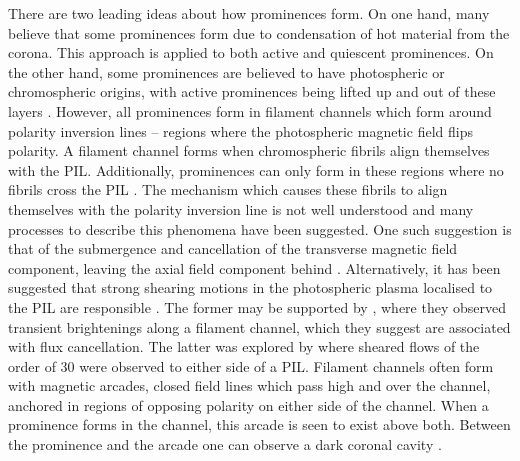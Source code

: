There are two leading ideas about how prominences form. On one hand, many believe that some prominences form due to condensation of hot material from the corona. This approach is applied to both active and quiescent prominences. On the other hand, some prominences are believed to have photospheric or chromospheric origins, with active prominences being lifted up and out of these layers \citep{tandberg-hanssen_nature_1995}. However, all prominences form in filament channels which form around polarity inversion lines \citep[PILs; ][]{vial_solar_2015} -- regions where the photospheric magnetic field flips polarity. A filament channel forms when chromospheric fibrils align themselves with the PIL. Additionally, prominences can only form in these regions where no fibrils cross the PIL \citep{martin_conditions_1998}. The mechanism which causes these fibrils to align themselves with the polarity inversion line is not well understood and many processes to describe this phenomena have been suggested. One such suggestion is that of the submergence and cancellation of the transverse magnetic field component, leaving the axial field component behind \citep{martin_conditions_1998, wang_formation_2007}. Alternatively, it has been suggested that strong shearing motions in the photospheric plasma localised to the PIL are responsible \citep{devore_dynamical_2000}. The former may be supported by \cite{wang_transient_2013}, where they observed transient brightenings along a filament channel, which they suggest are associated with flux cancellation. The latter was explored by \cite{hindman_helioseismically_2006} where sheared flows of the order of 30\kms{} were observed to either side of a PIL. Filament channels often form with magnetic arcades, closed field lines which pass high and over the channel, anchored in regions of opposing polarity on either side of the channel. When a prominence forms in the channel, this arcade is seen to exist above both. Between the prominence and the arcade one can observe a dark coronal cavity \citep{tandberg-hanssen_nature_1995}.

